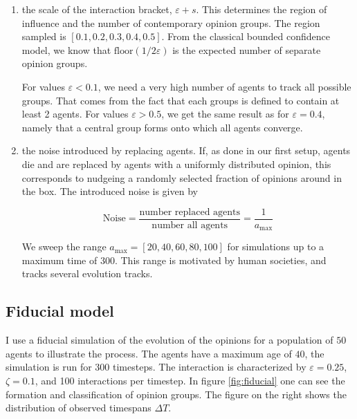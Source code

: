 \documentclass[useAMS,usenatbib]{templates/mn2e}
\begin{document}
\begin{enumerate}
    \item the scale of the interaction bracket, $\varepsilon+s$. This
    determines the region of influence and the number of
    contemporary opinion groups. The region sampled is $[0.1, 0.2,
    0.3, 0.4, 0.5]$. From the classical bounded confidence model, we
    know that $\text{floor}(1/2\varepsilon)$ is the expected number of
    separate opinion groups.

    For values $\varepsilon<0.1$, we need a very high
    number of agents to track all possible groups. That comes from the
    fact that each groups is defined to contain at least 2
    agents. For values $\varepsilon>0.5$, we get the same result as
    for $\varepsilon=0.4$, namely that a central group forms onto which
    all agents converge.
    \item the noise introduced by replacing agents. If, as done in our
    first setup, agents die and are replaced by agents with a
    uniformly distributed opinion, this corresponds to nudgeing a
    randomly selected fraction of opinions around in the box. The
    introduced noise is given by

    \begin{equation}
        \text{Noise}=\frac{\text{number replaced agents}}{\text{number
            all
            agents}} = \frac{1}{a_\text{max}}
    \end{equation}

    We sweep the range $a_\text{max}=[20, 40, 60, 80, 100]$ for
    simulations up to a maximum time of 300. This range is motivated by
    human societies, and tracks several evolution tracks.

\end{enumerate}


\subsection{Fiducial model}

I use a fiducial simulation of the evolution of the opinions for a
population of $50$ agents to illustrate the process. The agents have a maximum
age of $40$, the simulation is run for 300 timesteps. The interaction is characterized by
$\varepsilon=0.25$, $\zeta=0.1$, and 100 interactions per timestep. In
figure \ref{fig:fiducial} one can see the formation and classification
of opinion groups. The figure on the right shows the distribution of observed timespans $\Delta T$.
\end{document}
